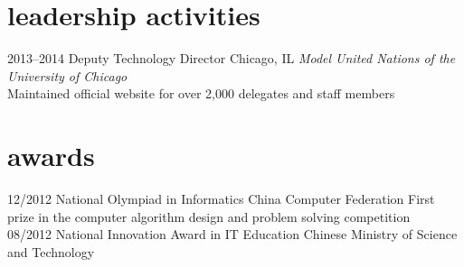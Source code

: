 \documentclass{friggeri-cv} %
\begin{document}
\section{leadership activities}

\begin{entrylist}
\entry
{2013--2014}
{Deputy Technology Director}
{Chicago, IL}
{\emph{Model United Nations of the University of Chicago} \\
Maintained official website for over 2,000 delegates and staff members \\}
\end{entrylist}


\section{awards}

\begin{entrylist}
\entry
{12/2012}
{National Olympiad in Informatics}
{China Computer Federation}
{First prize in the computer algorithm design and problem solving competition\\}
\entry
{08/2012}
{National Innovation Award in IT Education}
{Chinese Ministry of Science and Technology}
{}
\end{entrylist}
\end{document}
